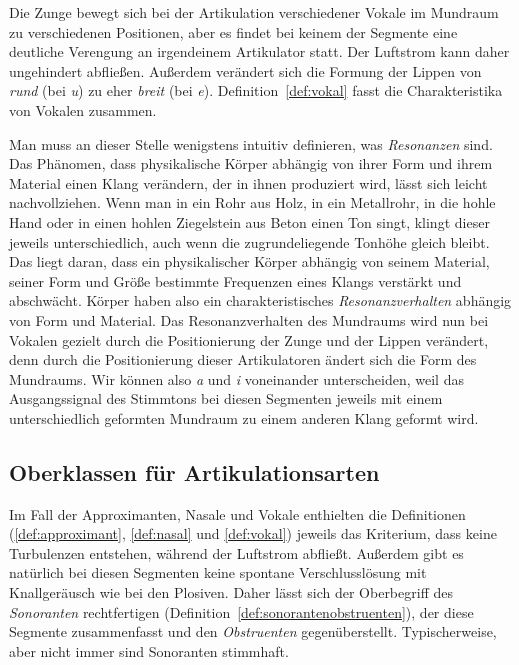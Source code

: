 Die Zunge bewegt sich bei der Artikulation verschiedener Vokale im Mund\-raum zu verschiedenen Positionen, aber es findet bei keinem der Segmente eine deutliche Verengung an irgendeinem Artikulator statt.
Der Luftstrom kann daher ungehindert abfließen.
Außerdem verändert sich die Formung der Lippen von \textit{rund} (\zB bei \textit{u}) zu eher \textit{breit} (\zB bei \textit{e}).
Definition~\ref{def:vokal} fasst die Charakteristika von Vokalen zusammen.


Man muss an dieser Stelle wenigstens intuitiv definieren, was \textit{Resonanzen} sind.
Das Phänomen, dass physikalische Körper abhängig von ihrer Form und ihrem Material einen Klang verändern, der in ihnen produziert wird, lässt sich leicht nachvollziehen.
Wenn man in ein Rohr aus Holz, in ein Metallrohr, in die hohle Hand oder in einen hohlen Ziegelstein aus Beton einen Ton singt, klingt dieser jeweils unterschiedlich, auch wenn die zugrundeliegende Tonhöhe gleich bleibt.
Das liegt daran, dass ein physikalischer Körper abhängig von seinem Material, seiner Form und Größe bestimmte Frequenzen eines Klangs verstärkt und abschwächt.
Körper haben also ein charakteristisches \textit{Resonanzverhalten} abhängig von Form und Material.
Das Resonanzverhalten des Mundraums wird nun bei Vokalen gezielt durch die Positionierung der Zunge und der Lippen verändert, denn durch die Positionierung dieser Artikulatoren ändert sich die Form des Mundraums.
Wir können also \textit{a} und \textit{i} voneinander unterscheiden, weil das Ausgangssignal des Stimmtons bei diesen Segmenten jeweils mit einem unterschiedlich geformten Mundraum zu einem anderen Klang geformt wird.

\subsection{Oberklassen für Artikulationsarten}

\label{sec:oberklassenfuerartikulationsarten}

Im Fall der Approximanten, Nasale und Vokale enthielten die Definitionen (\ref{def:approximant}, \ref{def:nasal} und \ref{def:vokal}) jeweils das Kriterium, dass keine Turbulenzen entstehen, während der Luftstrom abfließt.
Außerdem gibt es natürlich bei diesen Segmenten keine spontane Verschlusslösung mit Knallgeräusch wie bei den Plosiven.
Daher lässt sich der Oberbegriff des \textit{Sonoranten} rechtfertigen (Definition~\ref{def:sonorantenobstruenten}), der diese Segmente zusammenfasst und den \textit{Obstruenten} gegenüberstellt.
Typischerweise, aber nicht immer sind Sonoranten stimmhaft.

